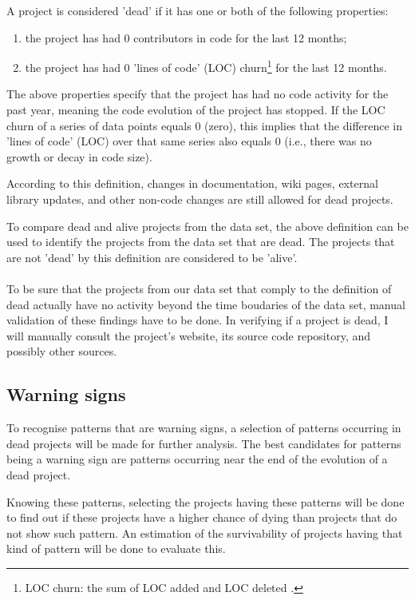 \noindent
\label{def:dead}
A project is considered 'dead' if it has one or both of the following
properties:
\begin{enumerate}
	\item the project has had 0 contributors in code for the last 12 months;
	\item the project has had 0 'lines of code' (LOC) churn\footnote{LOC churn:
	the sum of LOC added and LOC deleted \cite{elbaum}.} for the last 12 months.
\end{enumerate}

\noindent
The above properties specify that the project has had no code activity
for the past year, meaning the code evolution of the project has stopped. If
the LOC churn of a series of data points equals 0 (zero), this implies that the
difference in 'lines of code' (LOC) over that same series also equals 0 (i.e.,
there was no growth or decay in code size).

According to this definition, changes in documentation, wiki pages, external
library updates, and other non-code changes are still allowed for dead
projects.

To compare dead and alive projects from the data set, the above definition can
be used to identify the projects from the data set that are dead. The projects
that are not 'dead' by this definition are considered to be 'alive'.

\paragraph{}
To be sure that the projects from our data set that comply to the definition of
dead actually have no activity beyond the time boudaries of the data set,
manual validation of these findings have to be done. In verifying if a project
is dead, I will manually consult the project's website, its source code
repository, and possibly other sources.

\subsection{Warning signs}
To recognise patterns that are warning signs, a selection of patterns occurring
in dead projects will be made for further analysis. The best candidates for
patterns being a warning sign are patterns occurring near the end of the
evolution of a dead project.

Knowing these patterns, selecting the projects having these patterns will be
done to find out if these projects have a higher chance of dying than projects
that do not show such pattern. An estimation of the survivability of projects
having that kind of pattern will be done to evaluate this.

